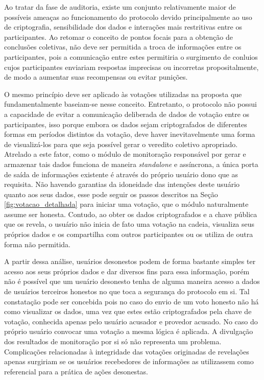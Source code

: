 Ao tratar da fase de auditoria, existe um conjunto relativamente maior de possíveis ameaças ao funcionamento do protocolo devido principalmente ao uso de criptografia, sensibilidade dos dados e interações mais restritivas entre os participantes. Ao retomar o conceito de pontos focais para a obtenção de conclusões coletivas, não deve ser permitida a troca de informações entre os participantes, pois a comunicação entre estes permitiria o surgimento de conluios cujos participantes enviariam respostas imprecisas ou incorretas propositalmente, de modo a aumentar suas recompensas ou evitar punições.

%
O mesmo princípio deve ser aplicado às votações utilizadas na proposta que fundamentalmente baseiam-se nesse conceito. Entretanto, o protocolo não possui a capacidade de evitar a comunicação deliberada de dados de votação entre os participantes, isso porque embora os dados sejam criptografados de diferentes formas em períodos distintos da votação, deve haver inevitavelmente uma forma de visualizá-los para que seja possível gerar o veredito coletivo apropriado. Atrelado a este fator, como o módulo de monitoração responsável por gerar e armazenar tais dados funciona de maneira \textit{standalone} e assíncrona, a única porta de saída de informações existente é através do próprio usuário dono que as requisita. Não havendo garantias da idoneidade das intenções deste usuário quanto aos seus dados, esse pode seguir os passos descritos na Seção \ref{fig:votacao_detalhada} para iniciar uma votação, que o módulo naturalmente assume ser honesta. Contudo, ao obter os dados criptografados e a chave pública que os revela, o usuário não inicia de fato uma votação na cadeia, visualiza seus próprios dados e os compartilha com outros participantes ou os utiliza de outra forma não permitida.

%
A partir dessa análise, usuários desonestos podem de forma bastante simples ter acesso aos seus próprios dados e dar diversos fins para essa informação, porém não é possível que um usuário desonesto tenha de alguma maneira acesso a dados de usuários terceiros honestos no que toca a segurança do protocolo em si. Tal constatação pode ser concebida pois no caso do envio de um voto honesto não há como visualizar os dados, uma vez que estes estão criptografados pela chave de votação, conhecida apenas pelo usuário acusador e provedor acusado. No caso do próprio usuário convocar uma votação a mesma lógica é aplicada. A divulgação dos resultados de monitoração por si só não representa um problema. Complicações relacionadas à integridade das votações originadas de revelações apenas surgiriam se os usuários recebedores de informações as utilizassem como referencial para a prática de ações desonestas.

